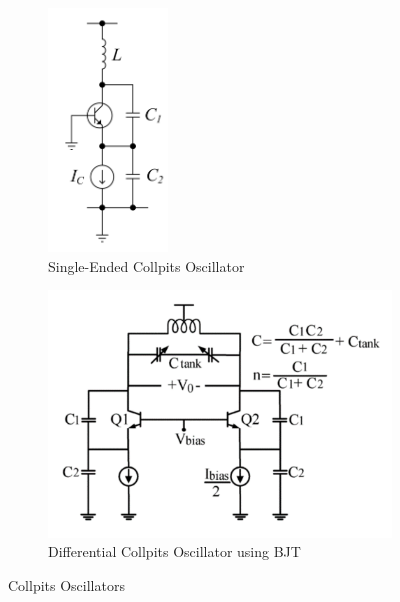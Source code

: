 \documentclass[]{extarticle}
\begin{document}
\begin{figure}[!h]
    \centering
    \begin{subfigure}{0.45\textwidth}
        \centering
        \includegraphics[width=0.35\textwidth]{collpits-oscilltor.png}
        \caption{Single-Ended Collpits Oscillator}
        \label{fig:collpits}
    \end{subfigure}
    \hspace{1cm} %
    \begin{subfigure}{0.45\textwidth}
        \centering
        \includegraphics[width=\textwidth]{Collpits-BJT-Diff.png}
        \caption{Differential Collpits Oscillator using BJT}
        \label{fig:collpits-bjt-diff}
    \end{subfigure}
    \caption{Collpits Oscillators}
    \label{fig:combined}
\end{figure} 
\end{document}
